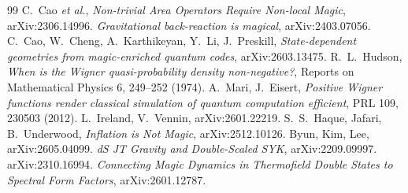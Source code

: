 \documentclass[11pt]{article}
\begin{document}
\begin{thebibliography}{99}
\small
{} C.~Cao \emph{et al.}, \emph{Non-trivial Area Operators
Require Non-local Magic}, arXiv:2306.14996.
 \emph{Gravitational back-reaction is magical},
arXiv:2403.07056.
 C.~Cao, W.~Cheng, A.~Karthikeyan, Y.~Li, J.~Preskill,
\emph{State-dependent geometries from magic-enriched quantum codes},
arXiv:2603.13475.
 R.~L.~Hudson, \emph{When is the Wigner quasi-probability
density non-negative?}, Reports on Mathematical Physics 6, 249--252 (1974).
 A.~Mari, J.~Eisert, \emph{Positive Wigner functions
render classical simulation of quantum computation efficient}, PRL 109,
230503 (2012).
 L.~Ireland, V.~Vennin, arXiv:2601.22219.
 S.~S.~Haque, Jafari, B.~Underwood,
\emph{Inflation is Not Magic}, arXiv:2512.10126.
 Byun, Kim, Lee, arXiv:2605.04099.
 \emph{dS JT Gravity and Double-Scaled SYK},
arXiv:2209.09997.
 arXiv:2310.16994.
 \emph{Connecting Magic Dynamics in Thermofield Double
States to Spectral Form Factors}, arXiv:2601.12787.
\end{thebibliography}
\end{document}

